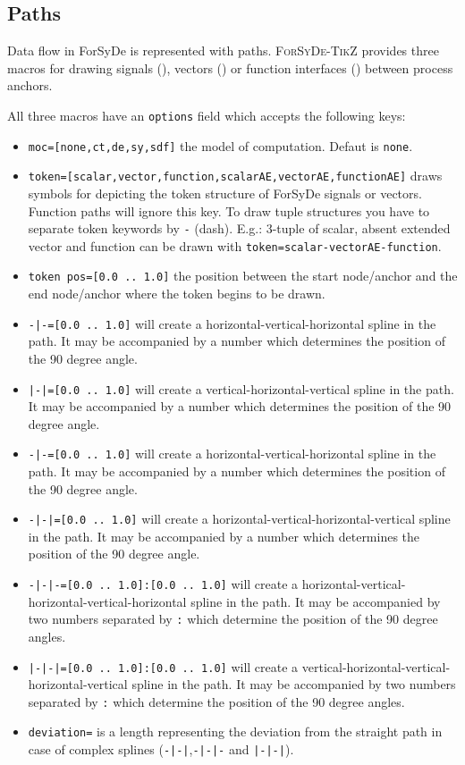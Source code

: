 \documentclass[10pt]{article}
\begin{document}
\subsection{Paths}

Data flow in ForSyDe is represented with paths. \textsc{ForSyDe-TikZ} provides three macros for drawing signals (\texttt{\string\signal}), vectors (\texttt{\string\vector}) or function interfaces (\texttt{\string\function}) between process anchors. 

All three macros have an \texttt{options} field which accepts the following keys:
\begin{itemize}
\item \texttt{moc=[none,ct,de,sy,sdf]} the model of computation. Defaut is \texttt{none}.
\item \texttt{token=[scalar,vector,function,scalarAE,vectorAE,functionAE]} draws symbols for depicting the token structure of ForSyDe signals or vectors. Function paths will ignore this key. To draw tuple structures you have to separate token keywords by \texttt{-} (dash). E.g.: 3-tuple of scalar, absent extended vector and function can be drawn with \texttt{token=scalar-vectorAE-function}.
\item \texttt{token pos=[0.0 .. 1.0]} the position between the start node/anchor and the end node/anchor where the token begins to be drawn.
\item \texttt{-|-=[0.0 .. 1.0]} will create a horizontal-vertical-horizontal spline in the path. It may be accompanied by a number which determines the position of the 90 degree angle.
\item \texttt{|-|=[0.0 .. 1.0]} will create a vertical-horizontal-vertical spline in the path. It may be accompanied by a number which determines the position of the 90 degree angle.
\item \texttt{-|-=[0.0 .. 1.0]} will create a horizontal-vertical-horizontal spline in the path. It may be accompanied by a number which determines the position of the 90 degree angle.
\item \texttt{-|-|=[0.0 .. 1.0]} will create a horizontal-vertical-horizontal-vertical spline in the path. It may be accompanied by a number which determines the position of the 90 degree angle.
\item \texttt{-|-|-=[0.0 .. 1.0]:[0.0 .. 1.0]} will create a horizontal-vertical-horizontal-vertical-horizontal spline in the path. It may be accompanied by two numbers  separated by \texttt{:} which determine the position of the 90 degree angles.
\item \texttt{|-|-|=[0.0 .. 1.0]:[0.0 .. 1.0]} will create a vertical-horizontal-vertical-horizontal-vertical spline in the path. It may be accompanied by two numbers  separated by \texttt{:} which determine the position of the 90 degree angles.
\item \texttt{deviation=} is a length representing the deviation from the straight path in case of complex splines (\texttt{-|-|},\texttt{-|-|-} and \texttt{|-|-|}).
\end{itemize}
\end{document}
